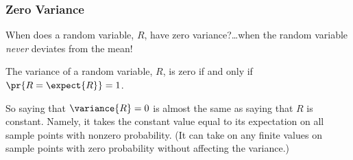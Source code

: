 \begin{optional}
\end{optional}
\fi

\iffalse

\subsubsection{Zero Variance}

When does a random variable, $R$, have zero variance?\dots when the random
variable \emph{never} deviates from the mean!
\begin{lemma}\label{zvar}
The variance of a random variable, $R$, is zero if and only if $\pr{R =
\expect{R}} = 1$.
\end{lemma}

So saying that $\variance{R}=0$ is almost the same as saying that $R$ is
constant.  Namely, it takes the constant value equal to its expectation on
all sample points with nonzero probability.  (It can take on any finite
values on sample points with zero probability without affecting the
variance.)

